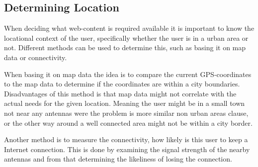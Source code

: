 \subsection{Determining Location}


When deciding what web-content is required available it is important to know the locational context of the user, specifically whether the user is in a urban area or not. Different methods can be used to determine this, such as basing it on map data or connectivity.

When basing it on map data the idea is to compare the current GPS-coordinates to the map data to determine if the coordinates are within a city boundaries. Disadvantages of this method is that map data might not correlate with the actual needs for the given location. Meaning the user might be in a small town not near any antennas were the problem is more similar non urban areas clause, or the other way around a well connected area might not be within a city border.

Another method is to measure the connectivity, how likely is this user to keep a Internet connection. This is done by examining the signal strength of the nearby antennas and from that determining the likeliness of losing the connection.   